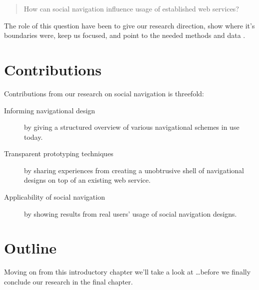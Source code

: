 \begin{quote}
  How can social navigation influence usage of established web services?
\end{quote}

The role of this question have been to give our research direction, show where
it's boundaries were, keep us focused, and point to the needed methods and
data \citep[p.~77]{silverman05}.


\section{Contributions}

Contributions from our research on social navigation is threefold:

\begin{description}
  \item[Informing navigational design] by giving a structured overview of
    various navigational schemes in use today.
  \item[Transparent prototyping techniques] by sharing experiences from
    creating a unobtrusive shell of navigational designs on top of an
    existing web service.
  \item[Applicability of social navigation] by showing results from real
    users' usage of social navigation designs.
\end{description}

\section{Outline}

Moving on from this introductory chapter we'll take a look at \ldots before we
finally conclude our research in the final chapter.

